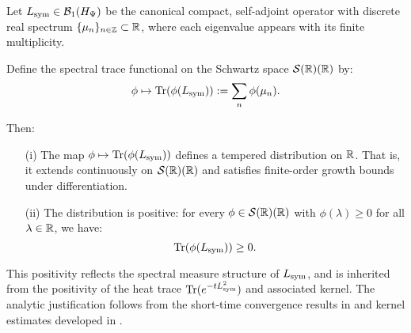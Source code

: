 \begin{lemma}
\label{lem:trace_distribution_positivity}

Let \( L_{\mathrm{sym}} \in \mathcal{B}_1(H_{\Psi}) \) be the canonical compact, self-adjoint operator with discrete real spectrum \( \{ \mu_n \}_{n \in \mathbb{Z}} \subset \mathbb{R} \), where each eigenvalue appears with its finite multiplicity.

Define the spectral trace functional on the Schwartz space \( \mathcal{S}(\mathbb{R})(\mathbb{R}) \) by:
\[
\phi \mapsto \operatorname{Tr}(\phi(L_{\mathrm{sym}})) := \sum_n \phi(\mu_n).
\]

Then:
\begin{enumerate}
  \item[\textup{(i)}] The map \( \phi \mapsto \operatorname{Tr}(\phi(L_{\mathrm{sym}})) \) defines a tempered distribution on \( \mathbb{R} \). That is, it extends continuously on \( \mathcal{S}(\mathbb{R})(\mathbb{R}) \) and satisfies finite-order growth bounds under differentiation.

  \item[\textup{(ii)}] The distribution is positive: for every \( \phi \in \mathcal{S}(\mathbb{R})(\mathbb{R}) \) with \( \phi(\lambda) \ge 0 \) for all \( \lambda \in \mathbb{R} \), we have:
  \[
  \operatorname{Tr}(\phi(L_{\mathrm{sym}})) \ge 0.
  \]
\end{enumerate}

\medskip

\noindent
This positivity reflects the spectral measure structure of \( L_{\mathrm{sym}} \), and is inherited from the positivity of the heat trace \( \operatorname{Tr}(e^{-t L_{\mathrm{sym}}^2}) \) and associated kernel. The analytic justification follows from the short-time convergence results in  and kernel estimates developed in .
\end{lemma}
